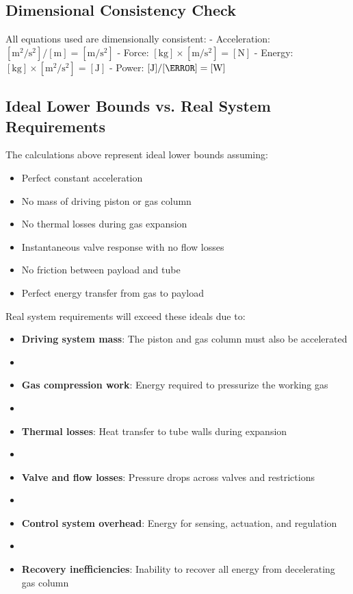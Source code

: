 \documentclass[12pt]{article}
\begin{document}
\subsection{Dimensional Consistency Check}
All equations used are dimensionally consistent:
- Acceleration: $[\text{m}^2/\text{s}^2] / [\text{m}] = [\text{m}/\text{s}^2]$ \checkmark
- Force: $[\text{kg}] \times [\text{m}/\text{s}^2] = [\text{N}]$ \checkmark
- Energy: $[\text{kg}] \times [\text{m}^2/\text{s}^2] = [\text{J}]$ \checkmark
- Power: $[\text{J}] / [\s] = [\text{W}]$ \checkmark

\subsection{Ideal Lower Bounds vs. Real System Requirements}
The calculations above represent ideal lower bounds assuming:
\begin{itemize}
    \item Perfect constant acceleration
    \item No mass of driving piston or gas column
    \item No thermal losses during gas expansion
    \item Instantaneous valve response with no flow losses
    \item No friction between payload and tube
    \item Perfect energy transfer from gas to payload
\end{itemize}

Real system requirements will exceed these ideals due to:
\begin{itemize}
    \item \textbf{Driving system mass}: The piston and gas column must also be accelerated
    \item \item \textbf{Gas compression work}: Energy required to pressurize the working gas
    \item \item \textbf{Thermal losses}: Heat transfer to tube walls during expansion
    \item \item \textbf{Valve and flow losses}: Pressure drops across valves and restrictions
    \item \item \textbf{Control system overhead}: Energy for sensing, actuation, and regulation
    \item \item \textbf{Recovery inefficiencies}: Inability to recover all energy from decelerating gas column
\end{itemize}
\end{document}
